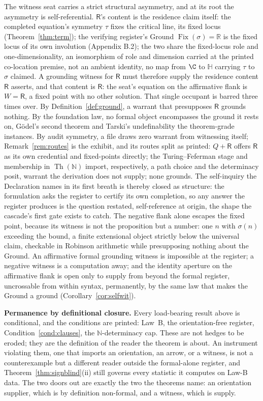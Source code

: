\documentclass[twocolumn,10pt]{article}
\theoremstyle{plain}
\theoremstyle{definition}
\newcommand{\R}{\mathsf{R}}
\newcommand{\N}{\mathbb{N}}
\newcommand{\Rl}{\mathbb{R}}
\newcommand{\Hq}{\mathbb{H}}
\begin{document}
The witness seat carries a strict structural asymmetry, and at its root the asymmetry is self-referential. $\R$'s content is the residence claim itself: the completed equation's symmetry $\tau$ fixes the critical line, its fixed locus (Theorem~\ref{thm:term}); the verifying register's Ground $\operatorname{Fix}(\sigma)=\Rl$ is the fixed locus of its own involution (Appendix B.2); the two share the fixed-locus role and one-dimensionality, an isomorphism of role and dimension carried at the printed co-location premise, not an ambient identity, no map from $\C$ to $\Hq$ carrying $\tau$ to $\sigma$ claimed. A grounding witness for $\R$ must therefore supply the residence content $\R$ asserts, and that content is $\R$: the seat's equation on the affirmative flank is $W=\R$, a fixed point with no other solution. That single occupant is barred three times over. By Definition~\ref{def:ground}, a warrant that presupposes $\R$ grounds nothing. By the foundation law, no formal object encompasses the ground it rests on, G\"odel's second theorem and Tarski's undefinability the theorem-grade instances. By audit symmetry, a file draws zero warrant from witnessing itself; Remark~\ref{rem:routes} is the exhibit, and its routes split as printed: $Q+\R$ offers $\R$ as its own credential and fixed-points directly; the Turing--Feferman stage and membership in $\operatorname{Th}(\N)$ import, respectively, a path choice and the determinacy posit, warrant the derivation does not supply; none grounds. The self-inquiry the Declaration names in its first breath is thereby closed as structure: the formulation asks the register to certify its own completion, so any answer the register produces is the question restated, self-reference at origin, the shape the cascade's first gate exists to catch. The negative flank alone escapes the fixed point, because its witness is not the proposition but a number: one $n$ with $\sigma(n)$ exceeding the bound, a finite extensional object strictly below the universal claim, checkable in Robinson arithmetic while presupposing nothing about the Ground. An affirmative formal grounding witness is impossible at the register; a negative witness is a computation away; and the identity aperture on the affirmative flank is open only to supply from beyond the formal register, uncrossable from within syntax, permanently, by the same law that makes the Ground a ground (Corollary~\ref{cor:selfwit}).

\textbf{Permanence by definitional closure.} Every load-bearing result above is conditional, and the conditions are printed: Law~B, the orientation-free register, Condition~\ref{cond:clauses}, the $\N$-determinacy cap. These are not hedges to be eroded; they are the definition of the reader the theorem is about. An instrument violating them, one that imports an orientation, an arrow, or a witness, is not a counterexample but a different reader outside the formal-alone register, and Theorem~\ref{thm:signblind}(ii) still governs every statistic it computes on Law-B data. The two doors out are exactly the two the theorems name: an orientation supplier, which is by definition non-formal, and a witness, which is supply.
\end{document}

